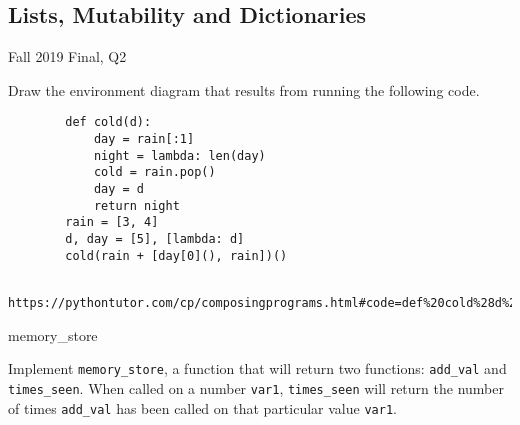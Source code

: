 \documentclass{exam}
\begin{document}
\begin{questions}
\begin{blocksection}
\section{Lists, Mutability and Dictionaries}
	\question Fall 2019 Final, Q2
    \begin{blocksection}
        Draw the environment diagram that results from running the following code.
        \begin{lstlisting}
        def cold(d):
            day = rain[:1]
            night = lambda: len(day)
            cold = rain.pop()
            day = d
            return night
        rain = [3, 4]
        d, day = [5], [lambda: d]
        cold(rain + [day[0](), rain])()
        \end{lstlisting}
    \end{blocksection}
    \begin{solution}
        \begin{lstlisting}
            https://pythontutor.com/cp/composingprograms.html#code=def%20cold%28d%29%3A%0A%20%20%20%20day%20%3D%20rain%5B%3A1%5D%0A%20%20%20%20night%20%3D%20lambda%3A%20len%28day%29%0A%20%20%20%20cold%20%3D%20rain.pop%28%29%0A%20%20%20%20day%20%3D%20d%0A%20%20%20%20return%20night%0Arain%20%3D%20%5B3,%204%5D%0Ad,%20day%20%3D%20%5B5%5D,%20%5Blambda%3A%20d%5D%0Acold%28rain%20%2B%20%5Bday%5B0%5D%28%29,%20rain%5D%29%28%29&cumulative=true&curInstr=17&mode=display&origin=composingprograms.js&py=3&rawInputLstJSON=%5B%5D
        \end{lstlisting}
    \end{solution}
	\question memory_store

    \begin{blocksection}
        Implement \lstinline{memory_store}, a function that will return two functions: \lstinline{add_val} and \lstinline{times_seen}. When called on a number \lstinline{var1}, \lstinline{times_seen} will return the number of times \lstinline{add_val} has been called on that particular value \lstinline{var1}.
        

\end{blocksection}
\end{blocksection}
\end{questions}
\end{document}
